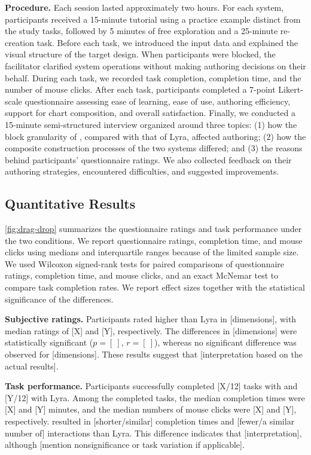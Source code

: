 \textbf{Procedure.}
Each session lasted approximately two hours. For each system, participants
received a 15-minute tutorial using a practice example distinct from the
study tasks, followed by 5 minutes of free exploration and a 25-minute
re-creation task. Before each task, we introduced the input data and explained
the visual structure of the target design. When participants were blocked,
the facilitator clarified system operations without making authoring
decisions on their behalf. During each task, we recorded task completion,
completion time, and the number of mouse clicks.
After each task, participants completed a 7-point Likert-scale questionnaire
assessing ease of learning, ease of use, authoring efficiency, support for
chart composition, and overall satisfaction. Finally, we conducted a
15-minute semi-structured interview organized around three topics:
(1) how the block granularity of {\system}, compared with that of Lyra,
affected authoring;
(2) how the composite construction processes of the two systems differed;
and (3) the reasons behind participants' questionnaire ratings. We also
collected feedback on their authoring strategies, encountered difficulties,
and suggested improvements.


\subsection{Quantitative Results}

\autoref{fig:drag-drop} summarizes the questionnaire ratings and
task performance under the two conditions. We report questionnaire ratings,
completion time, and mouse clicks using medians and interquartile ranges
because of the limited sample size. We used Wilcoxon signed-rank tests for
paired comparisons of questionnaire ratings, completion time, and mouse
clicks, and an exact McNemar test to compare task completion rates. We report
effect sizes together with the statistical significance of the differences.

\textbf{Subjective ratings.}
Participants rated {\system} higher than Lyra in [dimensions], with median
ratings of [X] and [Y], respectively. The differences in [dimensions] were
statistically significant ($p=[~]$, $r=[~]$), whereas no significant
difference was observed for [dimensions]. These results suggest that
[interpretation based on the actual results].

\textbf{Task performance.}
Participants successfully completed [X/12] tasks with {\system} and [Y/12]
with Lyra. Among the completed tasks, the median completion times were
[X] and [Y] minutes, and the median numbers of mouse clicks were [X] and
[Y], respectively. {\system} resulted in [shorter/similar] completion times
and [fewer/a similar number of] interactions than Lyra. This difference
indicates that [interpretation], although [mention nonsignificance or task
variation if applicable].

